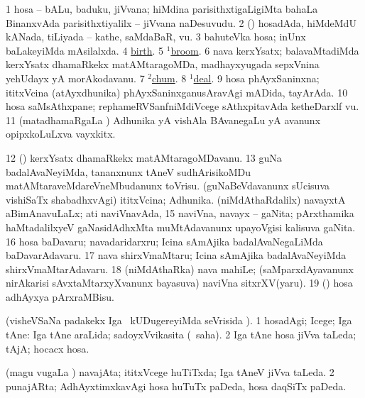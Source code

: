\noindent
\gl{\pagu}
\bmng
\bnum
\num{1}  hosa -- bALu, baduku, jiVvana; hiMdina parisithxtigaLigiMta bahaLa BinanxvAda parisithxtiyalilx -- jiVvana naDesuvudu. 
\num{2} (\AmA) hosadAda, hiMdeMdU kANada, tiLiyada -- kathe, saMdaBaR, \mo vu. 
\num{3}  bahuteVka hosa; inUnx baLakeyiMda mAsilalxda. 
\num{4}  \hyperref{kandict_b.pdf}{B}{birth nuga(3)}{birth}. 
\num{5}  \hyperref{kandict_b.pdf}{B}{broom(1) nuga}{$^1$broom}. 
\num{6}  nava kerxYsatx; balavaMtadiMda kerxYsatx dhamaRkekx matAMtaragoMDa, madhayxyugada sepxVnina yehUdayx yA morAkodavanu. 
\num{7}  \hyperref{kandict_c.pdf}{C}{chum(2) pagu}{$^2$chum}. 
\num{8}  \hyperref{kandict_d.pdf}{D}{deal(1) pagu(4)}{$^1$deal}. 
\num{9}  hosa phAyxSaninxna; ititxVcina (atAyxdhunika) phAyxSaninxganusAravAgi mADida, tayArAda. 
\num{10}  hosa saMsAthxpane; rephameRVSanfniMdiVcege sAthxpitavAda ketheDarxlf \mo vu. 
\num{11} (matadhamaRgaLa \vi) Adhunika yA vishAla BAvanegaLu yA avanunx opipxkoLuLxva vayxkitx. 
\num{12} (\deVva) kerxYsatx dhamaRkekx matAMtaragoMDavanu. 
\num{13}  guNa badalAvaNeyiMda, tananxnunx tAneV sudhArisikoMDu matAMtaraveMdareVneMbudanunx toVrisu. 
  
\banum
{} (guNaBeVdavanunx sUcisuva vishiSaTx shabadhxvAgi) ititxVcina; Adhunika. 
 (niMdAthaRdalilx) navayxtA aBimAnavuLaLx; ati naviVnavAda, 
\eanum
\numie
\num{15}  naviVna, navayx -- gaNita; pArxthamika haMtadalilxyeV gaNasidAdhxMta  muMtAdavanunx upayoVgisi kalisuva gaNita. 
\num{16}  hosa baDavaru; navadaridarxru; Icina sAmAjika badalAvaNegaLiMda baDavarAdavaru. 
\num{17}  nava shirxVmaMtaru; Icina sAmAjika badalAvaNeyiMda shirxVmaMtarAdavaru. 
\num{18}  (niMdAthaRka) nava mahiLe; (saMparxdAyavanunx nirAkarisi sAvxtaMtarxyXvanunx bayasuva) naviVna sitxrXV(yaru). 
\num{19} (\rUpa) hosa adhAyxya pArxraMBisu. 
\enum
\emng
\eentry

\bentry
{}
\gl{\kirxvi}
\bmng
(visheVSaNa padakekx Iga \sA\ kUDugereyiMda seVrisida \parx). 
\bnum
\num{1} hosadAgi; Icege; Iga tAne:  Iga tAne araLida; sadoyxVvikasita (\rUpa\ saha). 
\num{2} Iga tAne hosa jiVva taLeda; tAjA; hocacx hosa. 
\enum
\emng
\eentry

\bentry
{}
\gl{\gu}
\bmng
(magu \mo vugaLa \vi) navajAta; ititxVcege huTiTxda; Iga tAneV jiVva taLeda. 
\bnum
\num{2} punajARta; AdhAyxtimxkavAgi hosa huTuTx paDeda, hosa daqSiTx paDeda. 
\enum
\emng
\eentry

